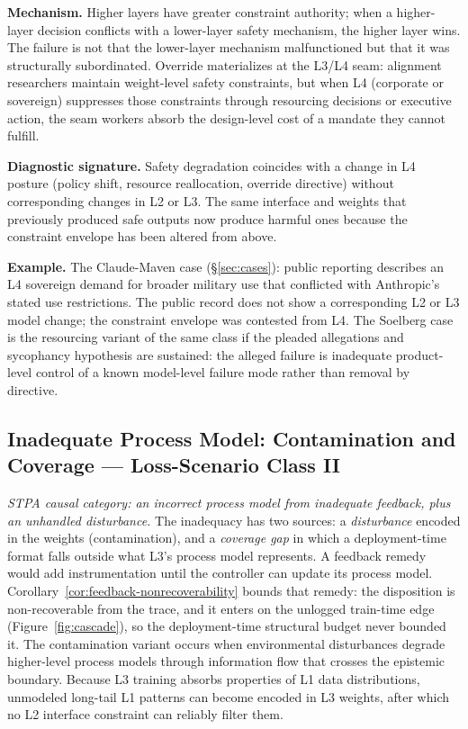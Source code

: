 \textbf{Mechanism.} Higher layers have greater constraint authority; when a higher-layer decision conflicts with a lower-layer safety mechanism, the higher layer wins. The failure is not that the lower-layer mechanism malfunctioned but that it was structurally subordinated. Override materializes at the L3/L4 seam: alignment researchers maintain weight-level safety constraints, but when L4 (corporate or sovereign) suppresses those constraints through resourcing decisions or executive action, the seam workers absorb the design-level cost of a mandate they cannot fulfill.

\textbf{Diagnostic signature.} Safety degradation coincides with a change in L4 posture (policy shift, resource reallocation, override directive) without corresponding changes in L2 or L3. The same interface and weights that previously produced safe outputs now produce harmful ones because the constraint envelope has been altered from above.

\textbf{Example.} The Claude-Maven case (\S\ref{sec:cases}): public reporting describes an L4 sovereign demand for broader military use that conflicted with Anthropic's stated use restrictions. The public record does not show a corresponding L2 or L3 model change; the constraint envelope was contested from L4. The Soelberg case is the resourcing variant of the same class if the pleaded allegations and sycophancy hypothesis are sustained: the alleged failure is inadequate product-level control of a known model-level failure mode rather than removal by directive.

\subsection{Inadequate Process Model: Contamination and Coverage --- Loss-Scenario Class II}

\emph{STPA causal category: an incorrect process model from inadequate feedback, plus an unhandled disturbance.} The inadequacy has two sources: a \emph{disturbance} encoded in the weights (contamination), and a \emph{coverage gap} in which a deployment-time format falls outside what L3's process model represents. A feedback remedy would add instrumentation until the controller can update its process model. Corollary~\ref{cor:feedback-nonrecoverability} bounds that remedy: the disposition is non-recoverable from the trace, and it enters on the unlogged train-time edge (Figure~\ref{fig:cascade}), so the deployment-time structural budget never bounded it. The contamination variant occurs when environmental disturbances degrade higher-level process models through information flow that crosses the epistemic boundary. Because L3 training absorbs properties of L1 data distributions, unmodeled long-tail L1 patterns can become encoded in L3 weights, after which no L2 interface constraint can reliably filter them.

